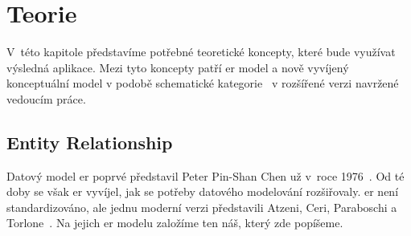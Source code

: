 \chapter{Teorie}

V~této kapitole představíme potřebné teoretické koncepty, které bude využívat výsledná aplikace.
Mezi tyto koncepty patří \acrfull{er} model a nově vyvíjený konceptuální model v podobě schematické kategorie~\cite{svoboda_categorical_2021} v rozšířené verzi navržené vedoucím práce.

\section{Entity Relationship}

Datový model \acrfull{er} poprvé představil Peter Pin-Shan Chen už v~roce 1976~\cite{chen_entity-relationship_1976}.
Od té doby se však \acrshort{er} vyvíjel, jak se potřeby datového modelování rozšiřovaly.
\acrshort{er} není standardizováno, ale jednu moderní verzi představili Atzeni, Ceri, Paraboschi a Torlone~\cite[s.~163-179]{atzeni_database_1999}.
Na jejich \acrshort{er} modelu založíme ten náš, který zde popíšeme.


